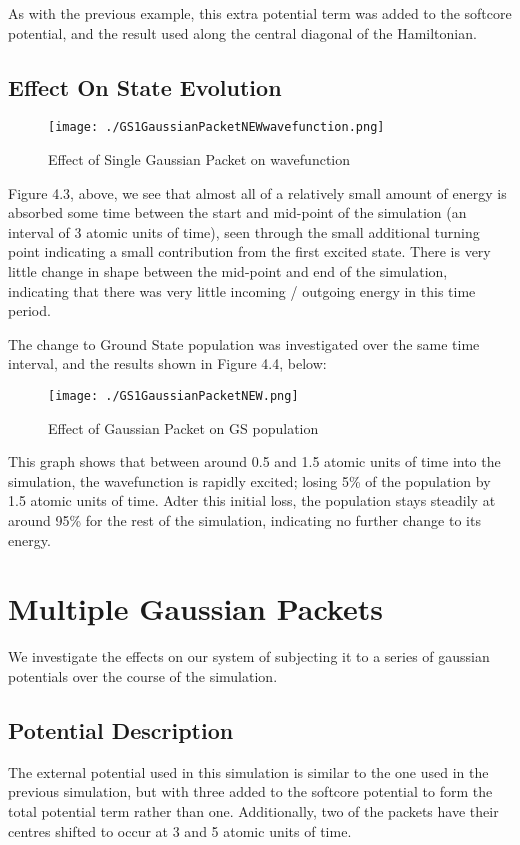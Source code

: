 As with the previous example, this extra potential term was added to the softcore potential, and the result used along the central diagonal of the Hamiltonian.

\subsection{Effect On State Evolution}

\begin{figure}[H]
          \texttt{[image: ./GS1GaussianPacketNEWwavefunction.png]}
          \centering
          \caption{Effect of Single Gaussian Packet on wavefunction}
\end{figure}

Figure 4.3, above, we see that almost all of a relatively small amount of energy is absorbed some time between the start and mid-point of the simulation (an interval of 3 atomic units of time), seen through the small additional turning point indicating a small contribution from the first excited state. There is very little change in shape between the mid-point and end of the simulation, indicating that there was very little incoming / outgoing energy in this time period.

The change to Ground State population was investigated over the same time interval, and the results shown in Figure 4.4, below:
\begin{figure}[H]
          \texttt{[image: ./GS1GaussianPacketNEW.png]}
          \centering
          \caption{Effect of Gaussian Packet on GS population}
\end{figure}

This graph shows that between around 0.5 and 1.5 atomic units of time into the simulation, the wavefunction is rapidly excited; losing 5\% of the population by 1.5 atomic units of time. Adter this initial loss, the population stays steadily at around 95\% for the rest of the simulation, indicating no further change to its energy.

\section{Multiple Gaussian Packets}

We investigate the effects on our system of subjecting it to a series of gaussian potentials over the course of the simulation. 

\subsection{Potential Description}
The external potential used in this simulation is similar to the one used in the previous simulation, but with three added to the softcore potential to form the total potential term rather than one. Additionally, two of the packets have their centres shifted to occur at 3 and 5 atomic units of time.

